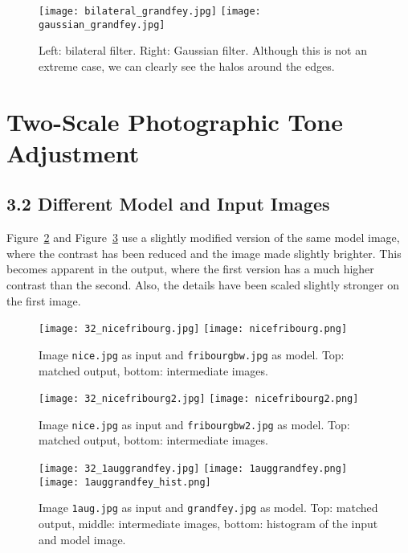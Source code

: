 \documentclass[11pt,a4paper]{article}
\begin{document}
\begin{figure}[htb]
    \begin{center}
    	\texttt{[image: bilateral\_grandfey.jpg]}
        \texttt{[image: gaussian\_grandfey.jpg]}
        \caption{Left: bilateral filter. Right: Gaussian filter. Although this is not an extreme case, we can clearly see the halos around the edges. \label{img:22zoom}}
    \end{center}
\end{figure}

\newpage
\FloatBarrier
\section{Two-Scale Photographic Tone Adjustment}
\subsection*{3.2 Different Model and Input Images}
Figure~\ref{img:nice1} and Figure~\ref{img:nice2} use a slightly modified version of the same model image, where the contrast has been reduced and the image made slightly brighter. This becomes apparent in the output, where the first version has a much higher contrast than the second. Also, the details have been scaled slightly stronger on the first image.
\begin{figure}[htb]
    \begin{center}
    	\texttt{[image: 32\_nicefribourg.jpg]}
    	\texttt{[image: nicefribourg.png]}
        \caption{Image \texttt{nice.jpg} as input and \texttt{fribourgbw.jpg} as model. Top: matched output, bottom: intermediate images.\label{img:nice1}}
    \end{center}
\end{figure}

\begin{figure}[htb]
    \begin{center}
    	\texttt{[image: 32\_nicefribourg2.jpg]}
    	\texttt{[image: nicefribourg2.png]}
        \caption{Image \texttt{nice.jpg} as input and \texttt{fribourgbw2.jpg} as model. Top: matched output, bottom: intermediate images.\label{img:nice2}}
    \end{center}
\end{figure}

\begin{figure}[htb]
    \begin{center}
    	\texttt{[image: 32\_1auggrandfey.jpg]}
    	\texttt{[image: 1auggrandfey.png]}
    	\texttt{[image: 1auggrandfey\_hist.png]}
        \caption{Image \texttt{1aug.jpg} as input and \texttt{grandfey.jpg} as model. Top: matched output, middle: intermediate images, bottom: histogram of the input and model image.}
    \end{center}
\end{figure}
\end{document}
